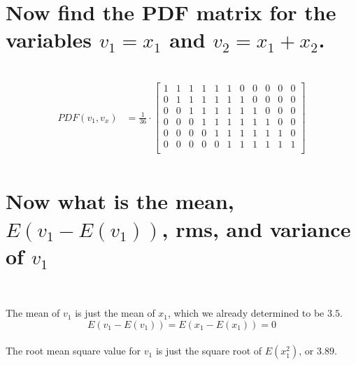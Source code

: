 \documentclass[12pt,letterpaper, onecolumn]{exam}
\begin{document}
\begin{questions}
\begin{parts}
            \part{Now find the PDF matrix for the variables $v_1 = x_1$ and $v_2 = x_1 + x_2$.}\\
                \solution
                    \begin{equation}
                        \begin{split}
                            PDF(v_1,v_x) & = \frac{1}{36}\cdot
                            \begin{bmatrix}
                                1 & 1 & 1 & 1 & 1 & 1 & 0 & 0 & 0 & 0 & 0\\
                                0 & 1 & 1 & 1 & 1 & 1 & 1 & 0 & 0 & 0 & 0\\
                                0 & 0 & 1 & 1 & 1 & 1 & 1 & 1 & 0 & 0 & 0\\
                                0 & 0 & 0 & 1 & 1 & 1 & 1 & 1 & 1 & 0 & 0\\
                                0 & 0 & 0 & 0 & 1 & 1 & 1 & 1 & 1 & 1 & 0\\
                                0 & 0 & 0 & 0 & 0 & 1 & 1 & 1 & 1 & 1 & 1\\
                            \end{bmatrix}\\
                        \end{split}
                    \end{equation}
            \part{Now what is the mean, $E(v_1 - E(v_1))$, rms, and variance of $v_1$}\\
                \solution
                    
                    The mean of $v_1$ is just the mean of $x_1$, which we already determined to be $3.5$.\\
                    
                    \begin{equation}
                        E(v_1 - E(v_1)) = E(x_1 - E(x_1)) = 0
                    \end{equation}\\
                    
                    The root mean square value for $v_1$ is just the square root of $E(x_1^2)$, or $3.89$.\\
                    

\end{parts}
\end{questions}
\end{document}
